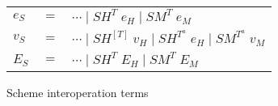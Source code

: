 \begin{figure}
\begin{center}
\begin{tabular}{lcl}
$e_{S}$ & $=$ & $\cdots\;\vert\;SH^{T}\;e_{H}\;\vert\;SM^{T}\;e_{M}$ \\
$v_{S}$ & $=$ & $\cdots\;\vert\;SH^{[T]}\;v_{H}\;\vert\;SH^{T^{a}}\;e_{H}\;\vert\;SM^{T^{a}}\;v_{M}$ \\
$E_{S}$ & $=$ & $\cdots\;\vert\;SH^{T}\;E_{H}\;\vert\;SM^{T}\;E_{M}$
\end{tabular}
\end{center}
\caption{Scheme interoperation terms}
\label{fig:sit}
\end{figure}